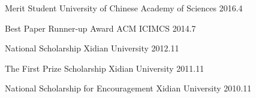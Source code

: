 



\begin{cvhonors}

  \cvhonor
    {Merit Student} %
    {University of Chinese Academy of Sciences} %
    {} %
    {2016.4} %

  \cvhonor
    {Best Paper Runner-up Award} %
    {ACM ICIMCS} %
    {} %
    {2014.7} %

  \cvhonor
    {National Scholarship} %
    {Xidian University} %
    {} %
    {2012.11} %

  \cvhonor
    {The First Prize Scholarship} %
    {Xidian University} %
    {} %
    {2011.11} %

  \cvhonor
    {National Scholarship for Encouragement} %
    {Xidian University} %
    {} %
    {2010.11} %

\end{cvhonors}
